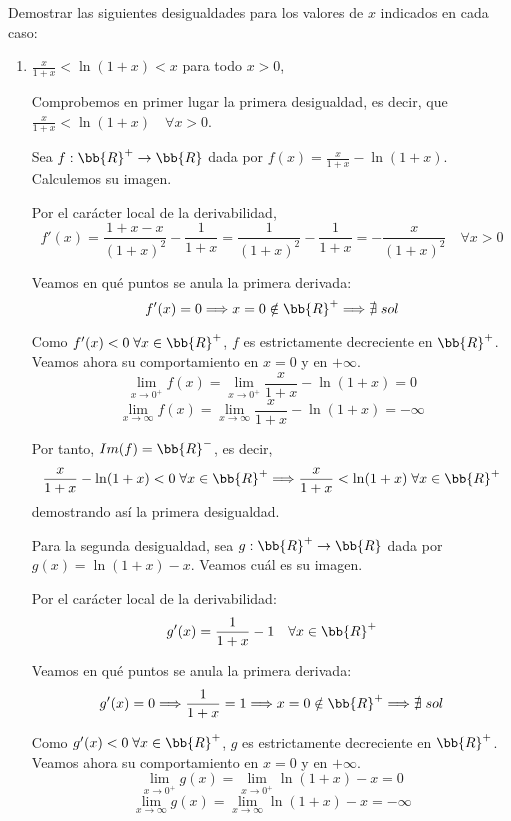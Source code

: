 \begin{ejercicio}
    Demostrar las siguientes desigualdades para los valores de $x$ indicados en cada caso:
    \begin{enumerate}
        \item $\frac{x}{1+x} < \ln(1+x)<x$ \quad para todo $x>0$,

        Comprobemos en primer lugar la primera desigualdad, es decir, que $\frac{x}{1+x} < \ln(1+x) \quad \forall x>0$.
        
        Sea $f:\bb{R}^+\to \bb{R}$ dada por $f(x)=\frac{x}{1+x} - \ln(1+x)$. Calculemos su imagen.

        Por el carácter local de la derivabilidad, $$f'(x)=\frac{1+x-x}{(1+x)^2} -\frac{1}{1+x}= \frac{1}{(1+x)^2} - \frac{1}{1+x} = -\frac{x}{(1+x)^2}\quad \forall x>0$$

        Veamos en qué puntos se anula la primera derivada:
        $$f'(x)=0 \Longrightarrow x=0 \notin \bb{R}^+ \Longrightarrow \nexists \;sol$$

        Como $f'(x)<0 \; \forall x\in \bb{R}^+$, $f$ es estrictamente decreciente en $\bb{R}^+$. Veamos ahora su comportamiento en $x=0$ y en $+\infty$.
        \begin{equation*}
            \lim_{x\to0^+}f(x)=\lim_{x\to0^+} \frac{x}{1+x} - \ln(1+x) = 0
        \end{equation*}
        \begin{equation*}
            \lim_{x\to\infty}f(x)=\lim_{x\to\infty} \frac{x}{1+x} - \ln(1+x) = -\infty
        \end{equation*}

        Por tanto, $Im(f)=\bb{R}^-$, es decir,
        $$\frac{x}{1+x} - \ln(1+x) <0 \;\forall x\in \bb{R}^+ \Longrightarrow \frac{x}{1+x} < \ln(1+x) \;\forall x\in \bb{R}^+ $$
        demostrando así la primera desigualdad.

        Para la segunda desigualdad, sea $g:\bb{R}^+\to \bb{R}$ dada por $g(x)=\ln(1+x) - x$. Veamos cuál es su imagen.

        Por el carácter local de la derivabilidad:
        $$g'(x)=\frac{1}{1+x}-1 \quad \forall x \in \bb{R}^+$$

        Veamos en qué puntos se anula la primera derivada:
        $$g'(x)=0 \Longrightarrow \frac{1}{1+x}=1 \Longrightarrow x=0 \notin \bb{R}^+ \Longrightarrow \nexists \;sol$$

        Como $g'(x)<0 \; \forall x\in \bb{R}^+$, $g$ es estrictamente decreciente en $\bb{R}^+$. Veamos ahora su comportamiento en $x=0$ y en $+\infty$.
        \begin{equation*}
            \lim_{x\to0^+}g(x)=\lim_{x\to0^+} \ln(1+x) - x = 0
        \end{equation*}
        \begin{equation*}
            \lim_{x\to\infty}g(x)=\lim_{x\to\infty} \ln(1+x) - x = -\infty
        \end{equation*}


\end{enumerate}
\end{ejercicio}

